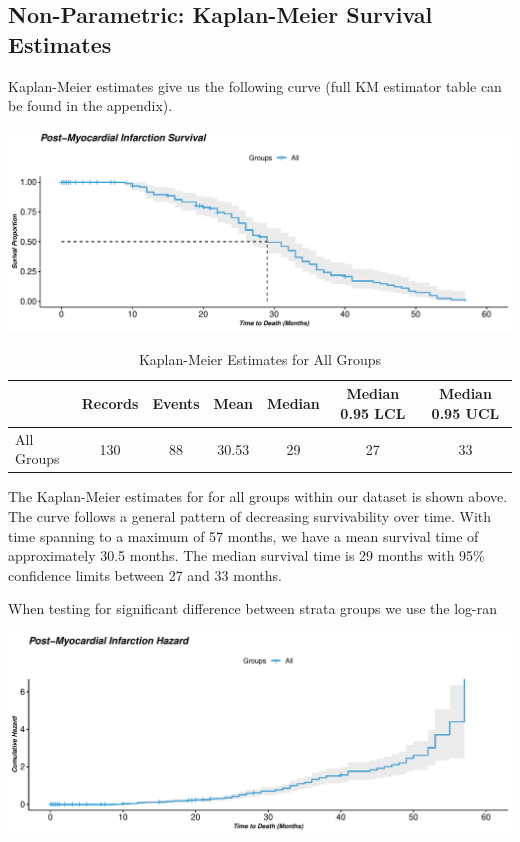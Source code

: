 \documentclass[
]{article}
\begin{document}
\hypertarget{non-parametric-kaplan-meier-survival-estimates}{%
\subsection{Non-Parametric: Kaplan-Meier Survival
Estimates}\label{non-parametric-kaplan-meier-survival-estimates}}

Kaplan-Meier estimates give us the following curve (full KM estimator
table can be found in the appendix).

\begin{center}\includegraphics{markdown_files/figure-latex/km.all-1} \end{center}

\begin{table}[!h]

\caption{\label{tab:ks1}Kaplan-Meier Estimates for All Groups}
\centering
\begin{tabular}[t]{l|c|c|c|c|c|c}
\hline
  & Records & Events & Mean & Median & Median 0.95 LCL & Median 0.95 UCL\\
\hline
All Groups & 130 & 88 & 30.53 & 29 & 27 & 33\\
\hline
\end{tabular}
\end{table}

The Kaplan-Meier estimates for for all groups within our dataset is
shown above. The curve follows a general pattern of decreasing
survivability over time. With time spanning to a maximum of 57 months,
we have a mean survival time of approximately 30.5 months. The median
survival time is 29 months with 95\% confidence limits between 27 and 33
months.

When testing for significant difference between strata groups we use the
log-ran

\begin{center}\includegraphics{markdown_files/figure-latex/kmhaz.all-1} \end{center}
\end{document}
